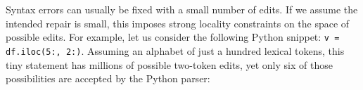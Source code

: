 \documentclass[sigplan,acmsmall,nonacm,screen]{acmart}\settopmatter{printfolios=false,printccs=false,printacmref=false}
\begin{document}
  Syntax errors can usually be fixed with a small number of edits. If we assume the intended repair is small, this imposes strong locality constraints on the space of possible edits. For example, let us consider the following Python snippet: \texttt{v = df.iloc(5:, 2:)}. Assuming an alphabet of just a hundred lexical tokens, this tiny statement has millions of possible two-token edits, yet only six of those possibilities are accepted by the Python parser:\vspace{-3pt}
%
%
%
%
%
%
%

\end{document}
